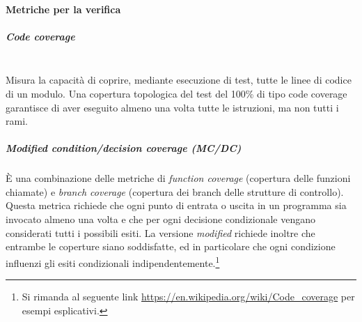\paragraph{Metriche per la verifica}\mbox{}
\subparagraph{Code coverage}\mbox{}\\
Misura la capacità di coprire, mediante esecuzione di test, tutte le linee di codice di un modulo. Una copertura topologica del test del 100\% di tipo code coverage garantisce di aver eseguito almeno una volta tutte le istruzioni, ma non tutti i rami.

\subparagraph{Modified condition/decision coverage (MC/DC)}
\`{E} una combinazione delle metriche di \textit{function coverage} (copertura delle funzioni chiamate) e \textit{branch coverage} (copertura dei branch delle strutture di controllo). Questa metrica richiede che ogni punto di entrata o uscita in un programma sia invocato almeno una volta e che per ogni decisione condizionale vengano considerati tutti i possibili esiti. La versione \textit{modified} richiede inoltre che entrambe le coperture siano soddisfatte, ed in particolare che ogni condizione influenzi gli esiti condizionali indipendentemente.\footnote{Si rimanda al seguente link \url{https://en.wikipedia.org/wiki/Code_coverage} per esempi esplicativi.}

